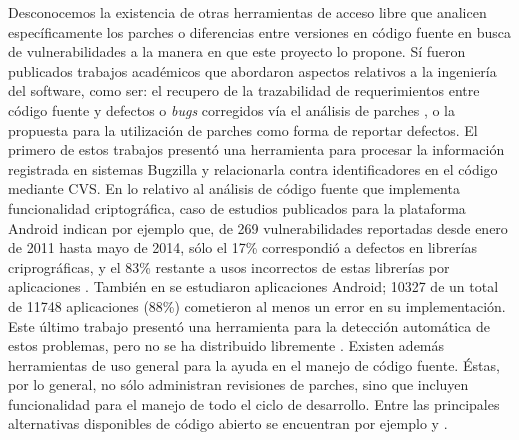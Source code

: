 \documentclass[11pt,a4paper]{article}
\begin{document}
Desconocemos la existencia de otras herramientas de acceso libre que analicen específicamente los parches o diferencias entre versiones en código fuente en busca de vulnerabilidades a la manera en que este proyecto lo propone. Sí fueron publicados trabajos académicos que abordaron aspectos relativos a la ingeniería del software, como ser: el recupero de la trazabilidad de requerimientos entre código fuente y defectos o \textit{bugs} corregidos vía el análisis de parches \cite{si1} , o la propuesta para la utilización de parches como forma de reportar defectos. El primero de estos trabajos presentó una herramienta para procesar la información registrada en sistemas Bugzilla y relacionarla contra identificadores en el código mediante CVS. En lo relativo al análisis de código fuente que implementa funcionalidad criptográfica, caso de estudios publicados para la plataforma Android indican por ejemplo que, de 269 vulnerabilidades reportadas desde enero de 2011 hasta mayo de 2014, sólo el 17\% correspondió a defectos en librerías criprográficas, y el 83\% restante a usos incorrectos de estas librerías por aplicaciones \cite{Lazar}. También en \cite{Egele} se estudiaron aplicaciones Android; 10327 de un total de 11748 aplicaciones (88\%) cometieron al menos un error en su implementación. Este último trabajo presentó una herramienta para la detección automática de estos problemas, pero no se ha distribuido libremente \cite{Mujic}. Existen además herramientas de uso general para la ayuda en el manejo de código fuente. Éstas, por lo general, no sólo administran revisiones de parches, sino que incluyen funcionalidad para el manejo de todo el ciclo de desarrollo. Entre las principales alternativas disponibles de código abierto se encuentran por ejemplo \cite{Gerr} y \cite{Phab}.
\\
\end{document}
